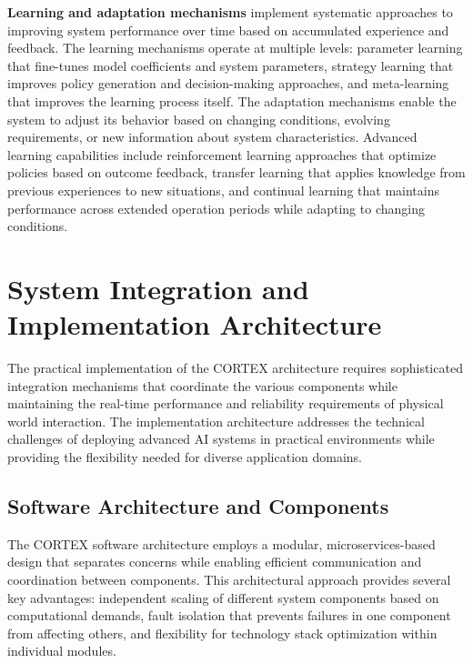 \textbf{Learning and adaptation mechanisms} implement systematic approaches to improving system performance over time based on accumulated experience and feedback. The learning mechanisms operate at multiple levels: parameter learning that fine-tunes model coefficients and system parameters, strategy learning that improves policy generation and decision-making approaches, and meta-learning that improves the learning process itself. The adaptation mechanisms enable the system to adjust its behavior based on changing conditions, evolving requirements, or new information about system characteristics. Advanced learning capabilities include reinforcement learning approaches that optimize policies based on outcome feedback, transfer learning that applies knowledge from previous experiences to new situations, and continual learning that maintains performance across extended operation periods while adapting to changing conditions.

\section{System Integration and Implementation Architecture}

The practical implementation of the CORTEX architecture requires sophisticated integration mechanisms that coordinate the various components while maintaining the real-time performance and reliability requirements of physical world interaction. The implementation architecture addresses the technical challenges of deploying advanced AI systems in practical environments while providing the flexibility needed for diverse application domains.

\subsection{Software Architecture and Components}

The CORTEX software architecture employs a modular, microservices-based design that separates concerns while enabling efficient communication and coordination between components. This architectural approach provides several key advantages: independent scaling of different system components based on computational demands, fault isolation that prevents failures in one component from affecting others, and flexibility for technology stack optimization within individual modules.

